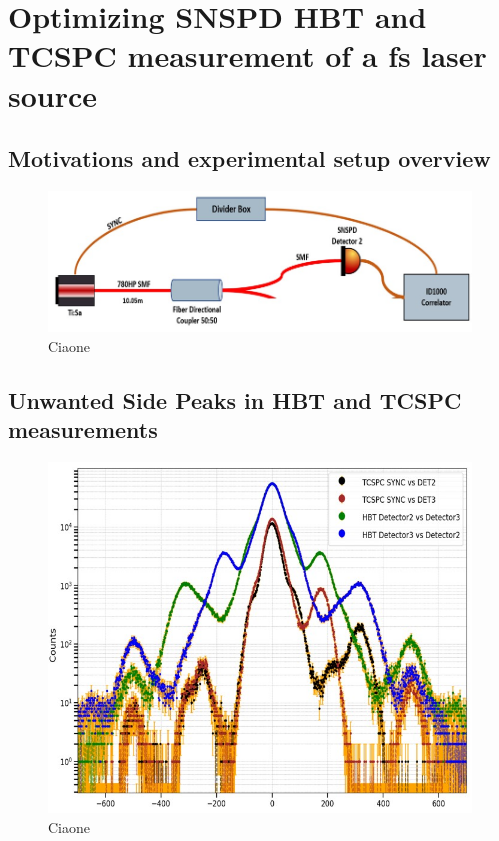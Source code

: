 \chapter{Optimizing SNSPD HBT and TCSPC measurement of a fs laser source}


\section{Motivations and experimental setup overview}
\begin{figure}[hbtp]
\centering
\includegraphics[width=1\textwidth]{TiSa_Setup.jpg}
\caption{Ciaone}
\label{TisaSetup}
\end{figure}



\section{Unwanted Side Peaks in HBT and TCSPC measurements}

\begin{figure}[hbtp]
\centering
\includegraphics[width=1\textwidth]{Khaos.jpg}
\caption{Ciaone}
\label{Khaos}
\end{figure}
